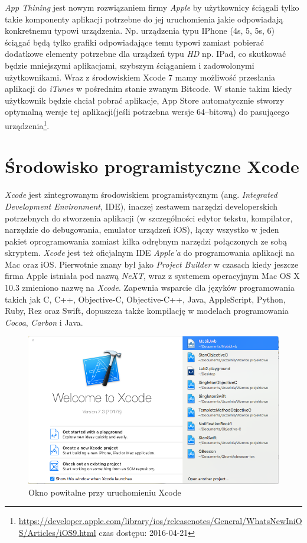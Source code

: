 \documentclass{iiuwb}
\begin{document}
\textit{App Thining} jest nowym rozwiązaniem firmy \textit{Apple} by użytkownicy ściągali tylko takie komponenty aplikacji potrzebne do jej uruchomienia jakie odpowiadają konkretnemu typowi urządzenia. Np. urządzenia typu IPhone (4s, 5, 5s, 6) ściągać będą tylko grafiki odpowiadające temu typowi zamiast pobierać dodatkowe elementy potrzebne dla urządzeń typu \textit{HD} np. IPad, co skutkować będzie mniejszymi aplikacjami, szybszym ściąganiem i zadowolonymi użytkownikami. Wraz z środowiskiem Xcode 7 mamy możliwość przesłania aplikacji do \textit{iTunes} w pośrednim stanie zwanym Bitcode. W stanie takim kiedy użytkownik będzie chciał pobrać aplikacje, App Store automatycznie stworzy optymalną wersje tej aplikacji(jeśli potrzebna wersje 64--bitową) do pasującego urządzenia\footnote{\url{https://developer.apple.com/library/ios/releasenotes/General/WhatsNewIniOS/Articles/iOS9.html} czas dostępu:  2016-04-21}. 


\section{Środowisko programistyczne Xcode}
\textit{Xcode} jest zintegrowanym środowiskiem programistycznym (ang. \textit{Integrated Development Environment}, IDE), inaczej zestawem narzędzi developerskich potrzebnych do stworzenia aplikacji (w szczególności edytor tekstu, kompilator, narzędzie do debugowania, emulator urządzeń iOS), łączy wszystko w jeden pakiet oprogramowania zamiast kilka odrębnym narzędzi połączonych ze sobą skryptem. \textit{Xcode} jest też oficjalnym IDE \textit{Apple'a} do programowania aplikacji na Mac oraz iOS. Pierwotnie znany był jako \textit{Project Builder} w czasach kiedy jeszcze firma Apple istniała pod nazwą \textit{NeXT}, wraz z systemem operacyjnym Mac OS X 10.3 zmieniono nazwę na \textit{Xcode}. Zapewnia wsparcie dla języków programowania takich jak C, C++, Objective-C, Objective-C++, Java, AppleScript, Python, Ruby, Rez oraz Swift, dopuszcza także kompilację w modelach programowania \textit{Cocoa}, \textit{Carbon} i Java.
\begin{figure}[!th]
\centering
\includegraphics[scale=.5]{image/XcodeOknoPowitalne.png}
\caption{Okno powitalne przy uruchomieniu Xcode}
\label{fig:XcodeOknoPowitalne}
\end{figure}
\end{document}
